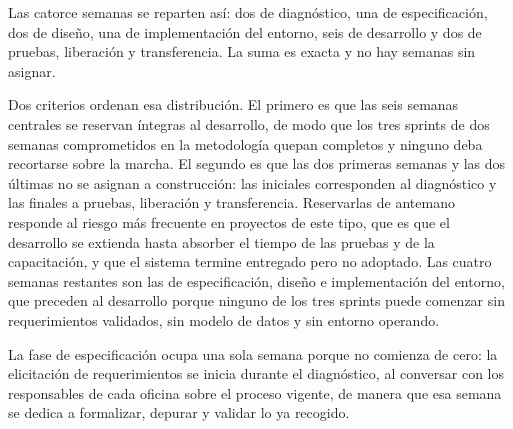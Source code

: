 Las catorce semanas se reparten así: dos de diagnóstico, una de especificación, dos de diseño, una de implementación del entorno, seis de desarrollo y dos de pruebas, liberación y transferencia. La suma es exacta y no hay semanas sin asignar.

Dos criterios ordenan esa distribución. El primero es que las seis semanas centrales se reservan íntegras al desarrollo, de modo que los tres sprints de dos semanas comprometidos en la metodología quepan completos y ninguno deba recortarse sobre la marcha. El segundo es que las dos primeras semanas y las dos últimas no se asignan a construcción: las iniciales corresponden al diagnóstico y las finales a pruebas, liberación y transferencia. Reservarlas de antemano responde al riesgo más frecuente en proyectos de este tipo, que es que el desarrollo se extienda hasta absorber el tiempo de las pruebas y de la capacitación, y que el sistema termine entregado pero no adoptado. Las cuatro semanas restantes son las de especificación, diseño e implementación del entorno, que preceden al desarrollo porque ninguno de los tres sprints puede comenzar sin requerimientos validados, sin modelo de datos y sin entorno operando.

La fase de especificación ocupa una sola semana porque no comienza de cero: la elicitación de requerimientos se inicia durante el diagnóstico, al conversar con los responsables de cada oficina sobre el proceso vigente, de manera que esa semana se dedica a formalizar, depurar y validar lo ya recogido.

